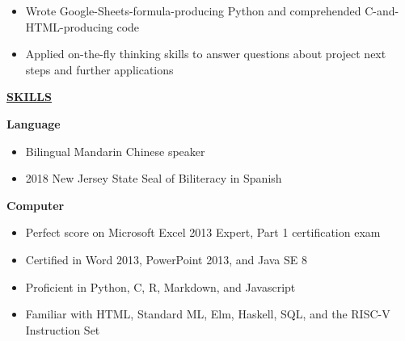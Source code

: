 \documentclass[
]{article}
\providecommand{\tightlist}{%
  \setlength{\itemsep}{0pt}\setlength{\parskip}{0pt}}
\begin{document}
\begin{itemize}
\tightlist
\item
Wrote Google-Sheets-formula-producing Python and comprehended C-and-HTML-producing code
\end{itemize}


\begin{itemize}
\tightlist
\item
Applied on-the-fly thinking skills to answer questions about project next steps and further applications
\end{itemize}






\textbf{\underline{SKILLS}}

\textbf{Language}

\begin{itemize}
\item
  Bilingual Mandarin Chinese speaker 
\item
  2018 New Jersey State Seal of Biliteracy in Spanish
\end{itemize}

\textbf{Computer}

\begin{itemize}
\item
  Perfect score on Microsoft Excel 2013 Expert, Part 1 certification
  exam
\item
  Certified in Word 2013, PowerPoint 2013, and Java SE 8
\end{itemize}

\begin{itemize}
\item
  Proficient in Python, C, R, Markdown, and Javascript
\item
  Familiar with HTML, Standard ML, Elm, Haskell, SQL, and the RISC-V
  Instruction Set
\end{itemize}
\end{document}

